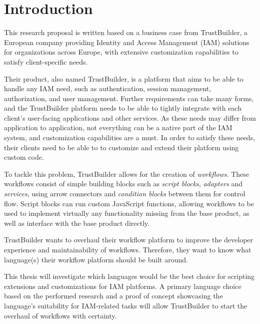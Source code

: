 
\section{Introduction}%
\label{sec:introduction}

This research proposal is written based on a business case from TrustBuilder, a European company providing Identity and Access Management (IAM) solutions for organizations across Europe, with extensive customization capabilities to satisfy client-specific needs.

Their product, also named TrustBuilder, is a platform that aims to be able to handle any IAM need, such as authentication, session management, authorization, and user management. Further requirements can take many forms, and the TrustBuilder platform needs to be able to tightly integrate with each client’s user-facing applications and other services. As these needs may differ from application to application, not everything can be a native part of the IAM system, and customization capabilities are a must. In order to satisfy these needs, their clients need to be able to to customize and extend their platform using custom code.

To tackle this problem, TrustBuilder allows for the creation of \emph{workflows}. These workflows consist of simple building blocks such as \emph{script blocks}, \emph{adapters} and \emph{services}, using arrow connectors and \emph{condition blocks} between them for control flow. Script blocks can run custom JavaScript functions, allowing workflows to be used to implement virtually any functionality missing from the base product, as well as interface with the base product directly.

TrustBuilder wants to overhaul their workflow platform to improve the developer experience and maintainability of workflows. Therefore, they want to know what language(s) their workflow platform should be built around.

This thesis will investigate which languages would be the best choice for scripting extensions and customizations for IAM platforms. A primary language choice based on the performed research and a proof of concept showcasing the language’s suitability for IAM-related tasks will allow TrustBuilder to start the overhaul of workflows with certainty.


